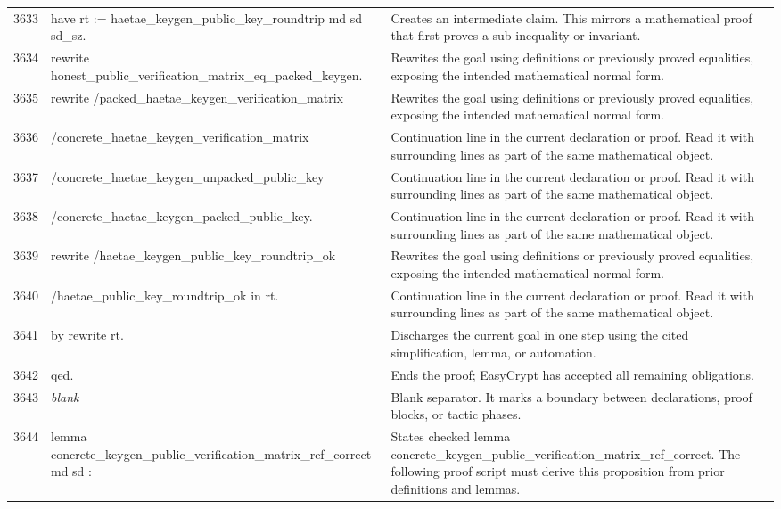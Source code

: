 \documentclass[10pt]{article}
\begin{document}
\begin{longtable}{r L{0.53\textwidth} L{0.37\textwidth}}
3633 & {\ttfamily\scriptsize have rt := haetae\_keygen\_public\_key\_roundtrip md sd sd\_sz.} & Creates an intermediate claim.  This mirrors a mathematical proof that first proves a sub-inequality or invariant. \\
3634 & {\ttfamily\scriptsize rewrite honest\_public\_verification\_matrix\_eq\_packed\_keygen.} & Rewrites the goal using definitions or previously proved equalities, exposing the intended mathematical normal form. \\
3635 & {\ttfamily\scriptsize rewrite /packed\_haetae\_keygen\_verification\_matrix} & Rewrites the goal using definitions or previously proved equalities, exposing the intended mathematical normal form. \\
3636 & {\ttfamily\scriptsize         /concrete\_haetae\_keygen\_verification\_matrix} & Continuation line in the current declaration or proof.  Read it with surrounding lines as part of the same mathematical object. \\
3637 & {\ttfamily\scriptsize         /concrete\_haetae\_keygen\_unpacked\_public\_key} & Continuation line in the current declaration or proof.  Read it with surrounding lines as part of the same mathematical object. \\
3638 & {\ttfamily\scriptsize         /concrete\_haetae\_keygen\_packed\_public\_key.} & Continuation line in the current declaration or proof.  Read it with surrounding lines as part of the same mathematical object. \\
3639 & {\ttfamily\scriptsize rewrite /haetae\_keygen\_public\_key\_roundtrip\_ok} & Rewrites the goal using definitions or previously proved equalities, exposing the intended mathematical normal form. \\
3640 & {\ttfamily\scriptsize         /haetae\_public\_key\_roundtrip\_ok in rt.} & Continuation line in the current declaration or proof.  Read it with surrounding lines as part of the same mathematical object. \\
3641 & {\ttfamily\scriptsize by rewrite rt.} & Discharges the current goal in one step using the cited simplification, lemma, or automation. \\
3642 & {\ttfamily\scriptsize qed.} & Ends the proof; EasyCrypt has accepted all remaining obligations. \\
3643 & {\ttfamily\scriptsize \emph{blank}} & Blank separator.  It marks a boundary between declarations, proof blocks, or tactic phases. \\
3644 & {\ttfamily\scriptsize lemma concrete\_keygen\_public\_verification\_matrix\_ref\_correct md sd :} & States checked lemma concrete\_keygen\_public\_verification\_matrix\_ref\_correct.  The following proof script must derive this proposition from prior definitions and lemmas. \\

\end{longtable}
\end{document}
